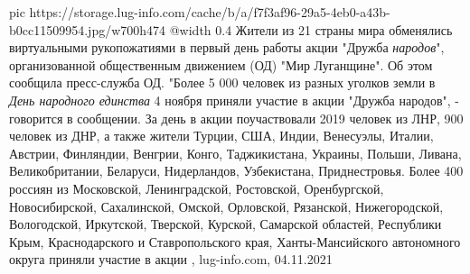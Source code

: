 \ifcmt
  pic https://storage.lug-info.com/cache/b/a/f7f3af96-29a5-4eb0-a43b-b0cc11509954.jpg/w700h474
  @width 0.4
\fi
Жители из 21 страны мира обменялись виртуальными рукопожатиями в первый день
работы акции "Дружба \emph{народов}", организованной общественным движением (ОД) "Мир
Луганщине". Об этом сообщила пресс-служба ОД.  "Более 5 000 человек из разных
уголков земли в \emph{День народного единства} 4 ноября приняли участие в акции
"Дружба народов", - говорится в сообщении.  За день в акции поучаствовали 2019
человек из ЛНР, 900 человек из ДНР, а также жители Турции, США, Индии,
Венесуэлы, Италии, Австрии, Финляндии, Венгрии, Конго, Таджикистана, Украины,
Польши, Ливана, Великобритании, Беларуси, Нидерландов, Узбекистана,
Приднестровья.  Более 400 россиян из Московской, Ленинградской, Ростовской,
Оренбургской, Новосибирской, Сахалинской, Омской, Орловской, Рязанской,
Нижегородской, Вологодской, Иркутской, Тверской, Курской, Самарской областей,
Республики Крым, Краснодарского и Ставропольского края, Ханты-Мансийского
автономного округа приняли участие в акции
, 
lug-info.com, 04.11.2021
